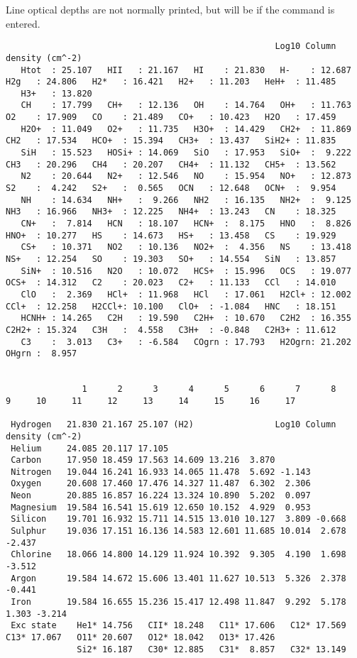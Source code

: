 Line optical depths are not normally printed, but will be if the
   command is entered.
{\setverbatimfontsize{\tiny}
\begin{verbatim}
                                                     Log10 Column density (cm^-2)
   Htot  : 25.107   HII   : 21.167   HI    : 21.830   H-    : 12.687   H2g   : 24.806   H2*   : 16.421   H2+   : 11.203   HeH+  : 11.485
   H3+   : 13.820
   CH    : 17.799   CH+   : 12.136   OH    : 14.764   OH+   : 11.763   O2    : 17.909   CO    : 21.489   CO+   : 10.423   H2O   : 17.459
   H2O+  : 11.049   O2+   : 11.735   H3O+  : 14.429   CH2+  : 11.869   CH2   : 17.534   HCO+  : 15.394   CH3+  : 13.437   SiH2+ : 11.835
   SiH   : 15.523   HOSi+ : 14.069   SiO   : 17.953   SiO+  :  9.222   CH3   : 20.296   CH4   : 20.207   CH4+  : 11.132   CH5+  : 13.562
   N2    : 20.644   N2+   : 12.546   NO    : 15.954   NO+   : 12.873   S2    :  4.242   S2+   :  0.565   OCN   : 12.648   OCN+  :  9.954
   NH    : 14.634   NH+   :  9.266   NH2   : 16.135   NH2+  :  9.125   NH3   : 16.966   NH3+  : 12.225   NH4+  : 13.243   CN    : 18.325
   CN+   :  7.814   HCN   : 18.107   HCN+  :  8.175   HNO   :  8.826   HNO+  : 10.277   HS    : 14.673   HS+   : 13.458   CS    : 19.929
   CS+   : 10.371   NO2   : 10.136   NO2+  :  4.356   NS    : 13.418   NS+   : 12.254   SO    : 19.303   SO+   : 14.554   SiN   : 13.857
   SiN+  : 10.516   N2O   : 10.072   HCS+  : 15.996   OCS   : 19.077   OCS+  : 14.312   C2    : 20.023   C2+   : 11.133   CCl   : 14.010
   ClO   :  2.369   HCl+  : 11.968   HCl   : 17.061   H2Cl+ : 12.002   CCl+  : 12.258   H2CCl+: 10.100   ClO+  : -1.084   HNC   : 18.151
   HCNH+ : 14.265   C2H   : 19.590   C2H+  : 10.670   C2H2  : 16.355   C2H2+ : 15.324   C3H   :  4.558   C3H+  : -0.848   C2H3+ : 11.612
   C3    :  3.013   C3+   : -6.584   COgrn : 17.793   H2Ogrn: 21.202   OHgrn :  8.957


               1      2      3      4      5      6      7      8      9     10     11     12     13     14     15     16     17

 Hydrogen   21.830 21.167 25.107 (H2)                Log10 Column density (cm^-2)
 Helium     24.085 20.117 17.105
 Carbon     17.950 18.459 17.563 14.609 13.216  3.870
 Nitrogen   19.044 16.241 16.933 14.065 11.478  5.692 -1.143
 Oxygen     20.608 17.460 17.476 14.327 11.487  6.302  2.306
 Neon       20.885 16.857 16.224 13.324 10.890  5.202  0.097
 Magnesium  19.584 16.541 15.619 12.650 10.152  4.929  0.953
 Silicon    19.701 16.932 15.711 14.515 13.010 10.127  3.809 -0.668
 Sulphur    19.036 17.151 16.136 14.583 12.601 11.685 10.014  2.678 -2.437
 Chlorine   18.066 14.800 14.129 11.924 10.392  9.305  4.190  1.698 -3.512
 Argon      19.584 14.672 15.606 13.401 11.627 10.513  5.326  2.378 -0.441
 Iron       19.584 16.655 15.236 15.417 12.498 11.847  9.292  5.178  1.303 -3.214
 Exc state    He1* 14.756   CII* 18.248   C11* 17.606   C12* 17.569   C13* 17.067   O11* 20.607   O12* 18.042   O13* 17.426
              Si2* 16.187   C30* 12.885   C31*  8.857   C32* 13.149
\end{verbatim}
}


